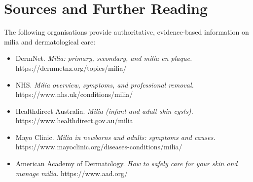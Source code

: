 \section*{Sources and Further Reading}
The following organisations provide authoritative, evidence-based information on milia and dermatological care:
\begin{itemize}
    \item DermNet. \textit{Milia: primary, secondary, and milia en plaque.} https://dermnetnz.org/topics/milia/
    \item NHS. \textit{Milia overview, symptoms, and professional removal.} https://www.nhs.uk/conditions/milia/
    \item Healthdirect Australia. \textit{Milia (infant and adult skin cysts).} https://www.healthdirect.gov.au/milia
    \item Mayo Clinic. \textit{Milia in newborns and adults: symptoms and causes.} https://www.mayoclinic.org/diseases-conditions/milia/
    \item American Academy of Dermatology. \textit{How to safely care for your skin and manage milia.} https://www.aad.org/
\end{itemize}
